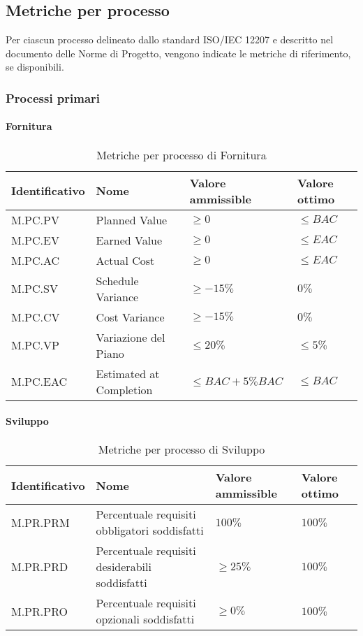 \subsection{Metriche per processo}
\label{subsec:processi_metriche}
Per ciascun processo delineato dallo standard ISO/IEC 12207 e descritto nel documento delle Norme di Progetto, 
vengono indicate le metriche di riferimento, se disponibili.

\subsubsection{Processi primari}
\paragraph{Fornitura}
\begin{table}[H]
    \centering
    \begin{tabular}{| l | l | l | l |}
    \hline
    \textbf{Identificativo} & 
    \textbf{Nome} &
    \textbf{Valore ammissible} &
    \textbf{Valore ottimo}\\
    \hline
        M.PC.PV & Planned Value & $\geq 0$ & $\leq BAC$ \\
    \hline
        M.PC.EV & Earned Value & $\geq 0$ & $\leq EAC$ \\
    \hline
        M.PC.AC & Actual Cost & $\geq 0$ & $\leq EAC$ \\
    \hline
        M.PC.SV & Schedule Variance & $\geq -15\%$ & $0\%$ \\
    \hline
        M.PC.CV & Cost Variance & $\geq -15\%$ & $0\%$ \\
    \hline  
        M.PC.VP & Variazione del Piano & $\leq 20\%$ & $\leq 5\%$ \\
    \hline
        M.PC.EAC & Estimated at Completion & $\leq BAC+5\% BAC$ & $\leq BAC$ \\
    \hline
\end{tabular}
\caption{Metriche per processo di Fornitura}
\label{tab:metriche_fornitura} 
\end{table}

\paragraph{Sviluppo}
\begin{table}[H]
    \centering
    \begin{tabular}{| l | l | l | l |}
    \hline
    \textbf{Identificativo} & 
    \textbf{Nome} &
    \textbf{Valore ammissible} &
    \textbf{Valore ottimo}\\
    \hline
        M.PR.PRM & Percentuale requisiti obbligatori soddisfatti & $100\%$ & $100\%$ \\
    \hline
        M.PR.PRD & Percentuale requisiti desiderabili soddisfatti & $\geq 25\%$ & $100\%$ \\
    \hline    
        M.PR.PRO & Percentuale requisiti opzionali soddisfatti & $\geq 0\%$ & $100\%$ \\
    \hline
\end{tabular}
\caption{Metriche per processo di Sviluppo}
\label{tab:metriche_sviluppo} 
\end{table}

